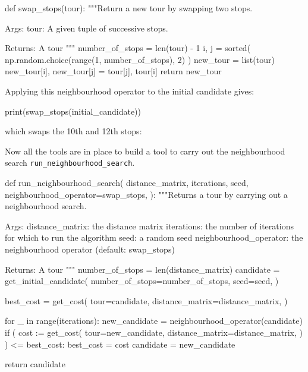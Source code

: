 \begin{pyin}
def swap_stops(tour):
    """Return a new tour by swapping two stops.

    Args:
        tour: A given tuple of successive stops.

    Returns:
        A tour
    """
    number_of_stops = len(tour) - 1
    i, j = sorted(
        np.random.choice(range(1, number_of_stops), 2)
    )
    new_tour = list(tour)
    new_tour[i], new_tour[j] = tour[j], tour[i]
    return new_tour
\end{pyin}

Applying this neighbourhood operator to the initial candidate gives:

\begin{pyin}
print(swap_stops(initial_candidate))
\end{pyin}

which swaps the 10th and 12th stops:

\begin{pyout}
[0, 7, 12, 5, 11, 3, 9, 2, 8, 1, 4, 10, 6, 0]
\end{pyout}

Now all the tools are in place to build a tool to carry out the
neighbourhood search \texttt{run_neighbourhood_search}.

\begin{pyin}
def run_neighbourhood_search(
    distance_matrix,
    iterations,
    seed,
    neighbourhood_operator=swap_stops,
):
    """Returns a tour by carrying out a neighbourhood search.

    Args:
        distance_matrix: the distance matrix
        iterations: the number of iterations for which to
                    run the algorithm
        seed: a random seed
        neighbourhood_operator: the neighbourhood operator
                                (default: swap_stops)

    Returns:
        A tour
    """
    number_of_stops = len(distance_matrix)
    candidate = get_initial_candidate(
        number_of_stops=number_of_stops,
        seed=seed,
    )

    best_cost = get_cost(
        tour=candidate,
        distance_matrix=distance_matrix,
    )

    for _ in range(iterations):
        new_candidate = neighbourhood_operator(candidate)
        if (
            cost := get_cost(
                tour=new_candidate,
                distance_matrix=distance_matrix,
            )
        ) <= best_cost:
            best_cost = cost
            candidate = new_candidate

    return candidate
\end{pyin}

